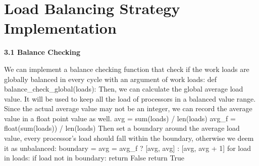 \documentclass{article}%
\newenvironment{code}%
   {\snugshade\verbatim}%
   {\endverbatim\endsnugshade}
\begin{document}
\section{Load Balancing Strategy Implementation}
\begin{Large}
\begin{LARGE}
\begin{flushleft}
\textbf{3.1 Balance Checking}
\end{flushleft}
\end{LARGE}

We can implement a balance checking function that check if the work loads are globally balanced in every cycle with an argument of work loads:
\begin{code}
    def balance_check_global(loads):
\end{code}
Then, we can calculate the global average load value. It will be used to keep all the load of processors in a balanced value range. Since the actual average value may not be an integer, we can record the average value in a float point value as well.
\begin{code}
    avg = sum(loads) / len(loads)
    avg_f = float(sum(loads)) / len(loads)
\end{code}
Then set a boundary around the average load value, every processor's load should fall within the boundary, otherwise we deem it as unbalanced:
\newpage
\begin{code}
    boundary = avg = avg_f ? [avg, avg] : [avg, avg + 1]
    for load in loads:
        if load not in boundary:
            return False
    return True
\end{code}


\end{Large}
\end{document}
